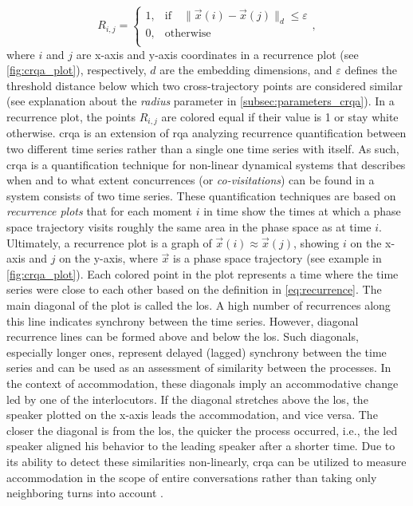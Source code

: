 \begin{equation}
	\label{eq:recurrence}
	R_{i,j} =
	\begin{cases}
		1,	&	\text{if} \quad \lVert \vec{x}(i)-\vec{x}(j) \rVert_d \leq \varepsilon \\
		0,	&	\text{otherwise} \\
	\end{cases},
\end{equation}
%
where $i$ and $j$ are x-axis and y-axis coordinates in a recurrence plot (see \cref{fig:crqa_plot}), respectively, $d$ are the embedding dimensions, and $\varepsilon$ defines the threshold distance below which two cross-trajectory points are considered similar (see explanation about the \emph{radius} parameter in \cref{subsec:parameters_crqa}).
In a recurrence plot, the points $R_{i,j}$ are colored equal if their value is 1 or stay white otherwise.
\Ac{crqa} is an extension of \ac{rqa} analyzing recurrence quantification between two different time series rather than a single one time series with itself.
As such, \ac{crqa} is a quantification technique for non-linear dynamical systems that describes when and to what extent concurrences (or \emph{co-visitations}) can be found in a system consists of two time series.
These quantification techniques are based on \emph{recurrence plots} that for each moment $i$ in time show the times at which a phase space trajectory visits roughly the same area in the phase space as at time $i$.
Ultimately, a recurrence plot is a graph of $\vec{x}(i) \approx \vec{x}(j)$, showing $i$ on the x-axis and $j$ on the y-axis, where $\vec{x}$ is a phase space trajectory (see example in \cref{fig:crqa_plot}).
Each colored point in the plot represents a time where the time series were close to each other based on the definition in \cref{eq:recurrence}.
The main diagonal of the plot is called the \acf{los}.
A high number of recurrences along this line indicates synchrony between the time series.
However, diagonal recurrence lines can be formed above and below the \ac{los}.
Such diagonals, especially longer ones, represent delayed (lagged) synchrony between the time series and can be used as an assessment of similarity between the processes.
In the context of accommodation, these diagonals imply an accommodative change led by one of the interlocutors.
If the diagonal stretches above the \ac{los}, the speaker plotted on the x-axis leads the accommodation, and vice versa.
The closer the diagonal is from the \ac{los}, the quicker the process occurred, i.e., the led speaker aligned his behavior to the leading speaker after a shorter time.
Due to its ability to detect these similarities non-linearly, \ac{crqa} can be utilized to measure accommodation in the scope of entire conversations rather than taking only neighboring turns into account \citep[cf.][]{Levitan2013entrainment}.

